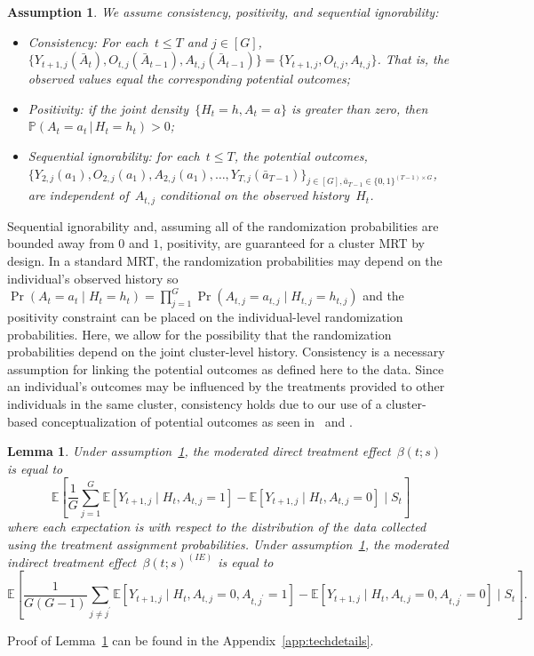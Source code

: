 \documentclass[12pt]{article}
\def\given{\, | \,}
\newtheorem{lemma}[thm]{Lemma}
\newtheorem{assumption}[thm]{Assumption}
\begin{document}
\begin{assumption} \normalfont
  \label{consistency}
  We assume consistency, positivity, and sequential ignorability:
  \begin{itemize}
  \item Consistency: For each~$t \leq T$ and $j \in [G]$,
    $\{Y_{t+1,j} (\bar{A}_{t} ), O_{t,j} (\bar A_{t-1}), A_{t,j} (\bar{A}_{t-1} )\}  = \{Y_{t+1, j}, O_{t,j}, A_{t,j}\}$.
    That is, the observed values equal the corresponding potential outcomes;
  \item Positivity: if the joint density~$\{ H_t = h, A_t = a\}$ is greater
    than zero, then~$\mathbb{P} (A_t = a_t \given H_t = h_t ) > 0$;
  \item Sequential ignorability: for each~$t \leq T$, the
    potential outcomes,\\ $\{Y_{2,j} ( a_{1}), O_{2,j}(a_{1}),A_{2,j}( a_{1}), \ldots,
    Y_{T,j} (\bar a_{T-1}) \}_{j \in [G], \bar a_{T-1}\in \{0,1\}^{(T-1)\times G}}$, are independent of~$A_{t,j}$ conditional on the observed history~$H_t$.
  \end{itemize}
\end{assumption}

Sequential ignorability and, assuming all of the randomization probabilities are bounded away from $0$ and $1$, positivity, are guaranteed for a cluster MRT by design. In a standard MRT, the randomization probabilities may depend on the individual's observed history so $\Pr(A_t = a_t \mid H_t = h_t) = \prod_{j=1}^G \Pr(A_{t,j} = a_{t,j} \mid H_{t,j} = h_{t,j})$ and the positivity constraint can be placed on the individual-level randomization probabilities.  Here, we allow for the possibility that the randomization probabilities depend on the joint cluster-level history. Consistency is a necessary assumption for linking the potential outcomes as defined here to the data. Since an individual's outcomes may be influenced by the treatments provided to other individuals in the same cluster, consistency holds due to our use of a cluster-based conceptualization of potential outcomes as seen in~\cite{Hong2006} and \cite{Vanderweele2013}.

\begin{lemma}
  \label{lemma:cond_effect}
  Under assumption~\ref{consistency}, the moderated direct treatment effect~$\beta(t;s)$ is equal to
  $$
  \mathbb{E} \left[ \frac{1}{G} \sum_{j=1}^G \mathbb{E} \left[ Y_{t+1,j} \mid H_{t}, A_{t,j} = 1 \right] - \mathbb{E} \left[ Y_{t+1,j} \mid H_{t}, A_{t,j} = 0 \right] \mid S_t \right]
  $$
  where each expectation is with respect to the distribution of the
  data collected using the treatment assignment probabilities. Under assumption~\ref{consistency}, the moderated indirect treatment effect~$\beta(t;s)^{(IE)}$ is equal to
  $$
  \mathbb{E} \left[ \frac{1}{G (G-1)} \sum_{j \neq j^\prime} \mathbb{E} \left[ Y_{t+1,j} \mid H_{t}, A_{t,j} = 0, A_{t,j^\prime} = 1 \right] - \mathbb{E} \left[ Y_{t+1,j} \mid H_{t}, A_{t,j} = 0, A_{t,j^\prime} = 0 \right] \mid S_t \right].
  $$
\end{lemma}
\noindent Proof of Lemma~\ref{lemma:cond_effect} can be found in the Appendix~\ref{app:techdetails}.
\end{document}
